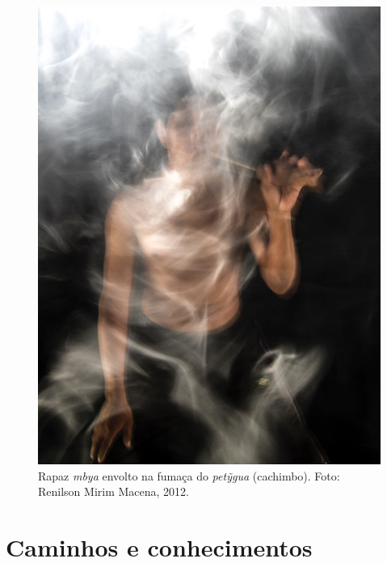 \begin{absolutelynopagebreak}
\begin{vplace}
 \begin{figure}[H]
 \begin{adjustwidth}{-2.7cm}{}
  \vspace{-3.05cm}
 \includegraphics[width=136mm]{./img/GUARANIS-img3.jpg}	
  \hfill
 \end{adjustwidth}
  \caption{Rapaz \emph{mbya} envolto na fumaça do \emph{petỹgua} (cachimbo). Foto: Renilson
Mirim Macena, 2012.}

\thispagestyle{empty}

\end{figure}
\end{vplace}

\end{absolutelynopagebreak}

\makeatletter\@openrightfalse
\movetooddpage
\part{Caminhos e conhecimentos}


